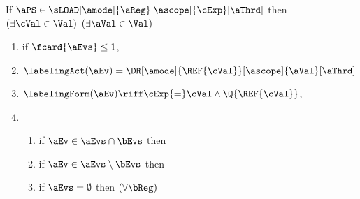 \begin{definition}
  \medskip
  \noindent
  If $\aPS \in \sLOAD[\amode]{\aReg}[\ascope]{\cExp}[\aThrd]$ then
  $(\exists\cVal\in\Val)$
  $(\exists\aVal\in\Val)$
  \begin{multicols}{2}
    \begin{enumerate}[topsep=0pt,label=(\textsc{r}\arabic*),ref=\textsc{r}\arabic*]
    \item \label{read-E-addr}
      if $\fcard{\aEvs}\leq1$,
    \item \label{read-lambda-addr}
      $\labelingAct(\aEv) = \DR[\amode]{\REF{\cVal}}[\ascope]{\aVal}[\aThrd]$
    \item \label{read-kappa-addr}
      \begin{math}
        \labelingForm(\aEv) 
        \riff
        \cExp{=}\cVal
        \land \Q{\REF{\cVal}}
      \end{math},
    \item[] 
      \begin{enumerate}[leftmargin=0pt]
      \item \label{read-tau-dep-addr}
        if $\aEv\in\aEvs\cap\bEvs$ then
        \makebox[0pt][l]{\begin{math}
            \aTr{\bEvs}{\bForm} \riff
            (\cExp{=}\cVal\limplies\aVal{=}\uReg{\aEv})
            \limplies \bForm[\uReg{\aEv}/\aReg]
          \end{math},}
      \item \label{read-tau-ind-addr}
        if $\aEv\in\aEvs\setminus\bEvs$ then
        \makebox[0pt][l]{\begin{math}
            \aTr{\bEvs}{\bForm} \riff
            \PBR{(\cExp{=}\cVal\limplies\aVal{=}\uReg{\aEv}) \lor (\cExp{=}\cVal\limplies\REF{\cVal}{=}\uReg{\aEv})}
            \limplies
            \bForm[\uReg{\aEv}/\aReg]
          \end{math},}
        \columnbreak
      \item \label{read-tau-empty-addr}
        if $\aEvs=\emptyset$ then 
        \begin{math}
          (\forall\bReg)

\end{math}
\end{enumerate}
\end{enumerate}
\end{multicols}
\end{definition}
